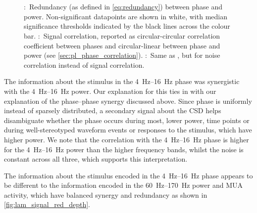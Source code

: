 \begin{figure}[tbp]
\centering
{}
\\
\\
\caption{
\protect{}:~Redundancy (as defined in \autoref{eq:redundancy}) between phase and power.
Non-significant datapoints are shown in white, with median significance thresholds indicated by the black lines across the colour bar.
\protect{}:~Signal correlation, reported as circular-circular correlation coefficient between phases and circular-linear between phase and power (see \autoref{sec:pl_phase_correlation}).
\protect{}:~Same as \protect{}, but for noise correlation instead of signal correlation.
}
\label{fig:lam_noisesignal_corr_depth}
\end{figure}


The information about the stimulus in the \SIrange{4}{16}{Hz} phase was synergistic with the \SIrange{4}{16}{Hz} power.
Our explanation for this ties in with our explanation of the phase--phase synergy discussed above.
Since phase is uniformly instead of sparsely distributed, a secondary signal about the \ac{CSD} helps disambiguate whether the phase occurs during most, lower power, time points or during well-stereotyped waveform events or responses to the stimulus, which have higher power.
We note that the correlation with the \SIrange{4}{16}{Hz} phase is higher for the \SIrange{4}{16}{Hz} power than the higher frequency bands, whilst the noise is constant across all three, which supports this interpretation.

The information about the stimulus encoded in the \SIrange{4}{16}{Hz} phase appears to be different to the information encoded in the \SIrange{60}{170}{Hz} power and \ac{MUA} activity, which have balanced synergy and redundancy as shown in \autoref{fig:lam_signal_red_depth}.


